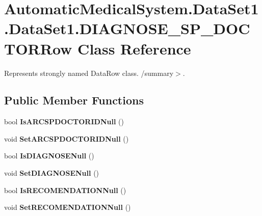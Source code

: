 \section{AutomaticMedicalSystem.DataSet1.DataSet1.DIAGNOSE\_\-SP\_\-DOCTORRow Class Reference}
\label{class_automatic_medical_system_1_1_data_set1_1_1_d_i_a_g_n_o_s_e___s_p___d_o_c_t_o_r_row}
Represents strongly named DataRow class. /summary$>$.  


\subsection*{Public Member Functions}
\begin{CompactItemize}
\item 
bool \textbf{IsARCSPDOCTORIDNull} ()\label{class_automatic_medical_system_1_1_data_set1_1_1_d_i_a_g_n_o_s_e___s_p___d_o_c_t_o_r_row_0452c0e358b79b67a038bfe5fd693e8a}

\item 
void \textbf{SetARCSPDOCTORIDNull} ()\label{class_automatic_medical_system_1_1_data_set1_1_1_d_i_a_g_n_o_s_e___s_p___d_o_c_t_o_r_row_2fe43f0b20133e4ed4db398c61dd9b4a}

\item 
bool \textbf{IsDIAGNOSENull} ()\label{class_automatic_medical_system_1_1_data_set1_1_1_d_i_a_g_n_o_s_e___s_p___d_o_c_t_o_r_row_64b6c69a9308134ec7fe68d7dca26c80}

\item 
void \textbf{SetDIAGNOSENull} ()\label{class_automatic_medical_system_1_1_data_set1_1_1_d_i_a_g_n_o_s_e___s_p___d_o_c_t_o_r_row_63f83d4e90a1e84ca21c4db49961b134}

\item 
bool \textbf{IsRECOMENDATIONNull} ()\label{class_automatic_medical_system_1_1_data_set1_1_1_d_i_a_g_n_o_s_e___s_p___d_o_c_t_o_r_row_e0911787b306eff96fd99dc61c56d992}

\item 
void \textbf{SetRECOMENDATIONNull} ()\label{class_automatic_medical_system_1_1_data_set1_1_1_d_i_a_g_n_o_s_e___s_p___d_o_c_t_o_r_row_62bc95664288a673edc41b3769db3fcf}

\end{CompactItemize}

